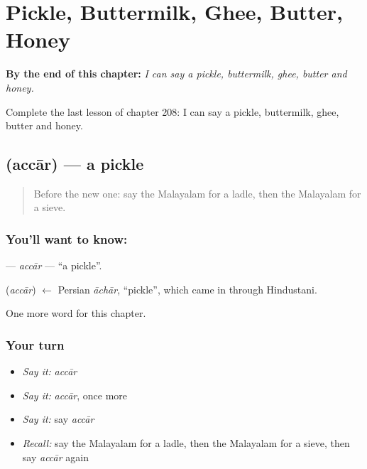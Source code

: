 
\chapter{Pickle, Buttermilk, Ghee, Butter, Honey}
\label{ch:ml-pickle-buttermilk-ghee-butter-honey}

\begin{chapteropening}
\textbf{By the end of this chapter:} \emph{I can say a pickle, buttermilk, ghee, butter and honey.}

Complete the last lesson of chapter 208: I can say a pickle, buttermilk, ghee, butter and honey.
\end{chapteropening}

\section[\texorpdfstring{\ml{അച്ചാർ} (accār)}{അച്ചാർ (accār)}]{ (accār) — a pickle}

\label{lesson:ML-C208-accar}



\begin{quote}
Before the new one: say the Malayalam for a ladle, then the Malayalam for a sieve.
\end{quote}

\subsection*{You'll want to know: }
\textbf{} — \emph{accār} — \textquotedblleft{}a pickle\textquotedblright{}.

\begin{cousinweb}
\textbf{} (\emph{accār}) $\leftarrow$ Persian \emph{āchār}, \textquotedblleft{}pickle\textquotedblright{}, which came in through Hindustani.
\end{cousinweb}

\begin{grammarlens}[title={What you've built}]
One more word for this chapter.
\end{grammarlens}

\subsection*{Your turn}
\begin{itemize}
\raggedright
  \item \emph{Say it:} \emph{accār}
  \item \emph{Say it:} \emph{accār}, once more
  \item \emph{Say it:} say \emph{accār}
  \item \emph{Recall:} say the Malayalam for a ladle, then the Malayalam for a sieve, then say \emph{accār} again
\end{itemize}

